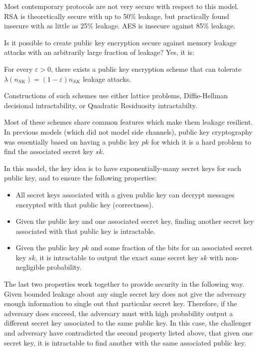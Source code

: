 \documentclass[10pt]{article}
\begin{document}
Most contemporary protocols are not very secure with respect to this model. RSA is theoretically secure with up to 50\% leakage, but practically found insecure with as little as 25\% leakage. AES is insecure against 85\% leakage.

Is it possible to create public key encryption secure against memory leakage attacks with an arbitrarily large fraction of leakage? Yes, it is:

\begin{theorem}
For every $\varepsilon > 0$, there exists a public key encryption scheme that can tolerate $\lambda(n_{SK}) = (1 - \varepsilon)n_{SK}$ leakage attacks.
\end{theorem}
Constructions of such schemes use either lattice problems, Diffie-Hellman decisional intractability, or Quadratic Residuosity intractabilty.

Most of these schemes share common features which make them leakage resilient. In previous models (which did not model side channels), public key cryptography was essentially based on having a public key $pk$ for which it is a hard problem to find the associated secret key $sk$.

In this model, the key idea is to have exponentially-many secret keys for each public key, and to ensure the following properties:
\begin{itemize}
\item All secret keys associated with a given public key can decrypt messages encrypted with that public key (correctness).
\item Given the public key and one associated secret key, finding another secret key associated with that public key is intractable.
\item Given the public key $pk$ and some fraction of the bits for an associated secret key $sk$, it is intractable to output the exact same secret key $sk$ with non-negligible probability.
\end{itemize}

The last two properties work together to provide security in the following way. Given bounded leakage about any single secret key does not give the adversary enough information to single out that particular secret key. Therefore, if the adversary does succeed, the adversary must with high probability output a different secret key associated to the same public key. In this case, the challenger and adversary have contradicted the second property listed above, that given one secret key, it is intractable to find another with the same associated public key.
\end{document}
